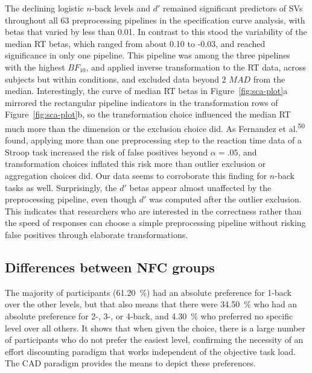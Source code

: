 \documentclass[
  man,floatsintext]{apa6}
\begin{document}
The declining logistic \(n\)-back levels and \(d'\) remained significant predictors of SVs throughout all 63 preprocessing pipelines in the specification curve analysis, with betas that varied by less than 0.01.
In contrast to this stood the variability of the median RT betas, which ranged from about 0.10 to -0.03, and reached significance in only one pipeline.
This pipeline was among the three pipelines with the highest \(BF_{10}\), and applied inverse transformation to the RT data, across subjects but within conditions, and excluded data beyond 2 \(MAD\) from the median.
Interestingly, the curve of median RT betas in Figure~\ref{fig:sca-plot}a mirrored the rectangular pipeline indicators in the transformation rows of Figure~\ref{fig:sca-plot}b, so the transformation choice influenced the median RT much more than the dimension or the exclusion choice did.
As Fernandez et al.\textsuperscript{50} found, applying more than one preprocessing step to the reaction time data of a Stroop task increased the risk of false positives beyond \(\alpha=.05\), and transformation choices inflated this risk more than outlier exclusion or aggregation choices did.
Our data seems to corroborate this finding for \(n\)-back tasks as well.
Surprisingly, the \(d'\) betas appear almost unaffected by the preprocessing pipeline, even though \(d'\) was computed after the outlier exclusion.
This indicates that researchers who are interested in the correctness rather than the speed of responses can choose a simple preprocessing pipeline without risking false positives through elaborate transformations.

\hypertarget{differences-between-nfc-groups-1}{%
\subsection{Differences between NFC groups}\label{differences-between-nfc-groups-1}}

The majority of participants (61.20~\%) had an absolute preference for 1-back over the other levels, but that also means that there were 34.50~\% who had an absolute preference for 2-, 3-, or 4-back, and 4.30~\% who preferred no specific level over all others.
It shows that when given the choice, there is a large number of participants who do not prefer the easiest level, confirming the necessity of an effort discounting paradigm that works independent of the objective task load.
The CAD paradigm provides the means to depict these preferences.
\end{document}
